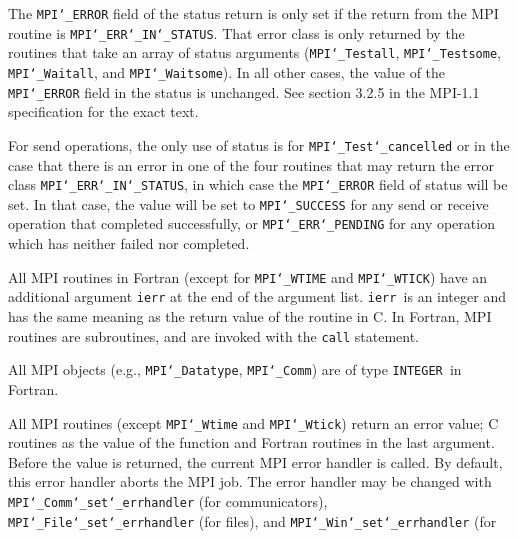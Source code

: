 \par
{}
\par
The {\tt MPI{\tt \char`\_}ERROR} field of the status return is only set if
the return from the MPI routine is {\tt MPI{\tt \char`\_}ERR{\tt \char`\_}IN{\tt \char`\_}STATUS}.  That error class
is only returned by the routines that take an array of status arguments
({\tt MPI{\tt \char`\_}Testall}, {\tt MPI{\tt \char`\_}Testsome}, {\tt MPI{\tt \char`\_}Waitall}, and {\tt MPI{\tt \char`\_}Waitsome}).  In
all other cases, the value of the {\tt MPI{\tt \char`\_}ERROR} field in the status is
unchanged.  See section 3.2.5 in the MPI-1.1 specification for the
exact text.
\par
For send operations, the only use of status is for {\tt MPI{\tt \char`\_}Test{\tt \char`\_}cancelled} or
in the case that there is an error in one of the four routines that
may return the error class {\tt MPI{\tt \char`\_}ERR{\tt \char`\_}IN{\tt \char`\_}STATUS}, in which case the
{\tt MPI{\tt \char`\_}ERROR} field of status will be set.  In that case, the value
will be set to {\tt MPI{\tt \char`\_}SUCCESS} for any send or receive operation that completed
successfully, or {\tt MPI{\tt \char`\_}ERR{\tt \char`\_}PENDING} for any operation which has neither
failed nor completed.
\par
{}
All MPI routines in Fortran (except for {\tt MPI{\tt \char`\_}WTIME} and {\tt MPI{\tt \char`\_}WTICK}) have
an additional argument {\tt ierr} at the end of the argument list.  {\tt ierr
}is an integer and has the same meaning as the return value of the routine
in C.  In Fortran, MPI routines are subroutines, and are invoked with the
{\tt call} statement.
\par
All MPI objects (e.g., {\tt MPI{\tt \char`\_}Datatype}, {\tt MPI{\tt \char`\_}Comm}) are of type {\tt INTEGER
}in Fortran.
\par
{}
\par
All MPI routines (except {\tt MPI{\tt \char`\_}Wtime} and {\tt MPI{\tt \char`\_}Wtick}) return an error value;
C routines as the value of the function and Fortran routines in the last
argument.  Before the value is returned, the current MPI error handler is
called.  By default, this error handler aborts the MPI job.  The error handler
may be changed with {\tt MPI{\tt \char`\_}Comm{\tt \char`\_}set{\tt \char`\_}errhandler} (for communicators),
{\tt MPI{\tt \char`\_}File{\tt \char`\_}set{\tt \char`\_}errhandler} (for files), and {\tt MPI{\tt \char`\_}Win{\tt \char`\_}set{\tt \char`\_}errhandler} (for
